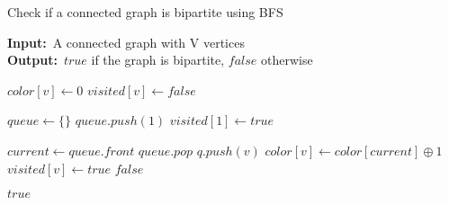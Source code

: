 \documentclass[12pt]{article}
\renewcommand{\algorithmicrequire}{\textbf{Input:}}
\renewcommand{\algorithmicensure}{\textbf{Output:}}
\begin{document}
\begin{algorithm}

  \caption{Check if a connected graph is bipartite using BFS}
  
  \algorithmicrequire \ A connected graph with V vertices\\
  \algorithmicensure \ $true$ if the graph is bipartite, $false$ otherwise
  
  \begin{algorithmic}[1]
    
    \Statex
    
    
        
         
            \State $color[v] \gets 0$
            \State $visited[v] \gets false$
        \EndFor
        
        \Statex
        \State $queue \gets \{\}$ 
        \State $queue.push(1)$ 
        \State $visited[1] \gets true$
        
        \Statex
        
            \State $current \gets queue.front$
            \State $queue.pop$
                    \State $q.push(v)$ 
                    \State $color[v] \gets color[current] \oplus 1$ 
                    \State $visited[v] \gets true$
                \Else
                     
                        \State \Return $false$ 
                    \EndIf
                \EndIf
            \EndFor
        \EndWhile
        
        \Statex 
        
        \State \Return $true$
    \EndFunction
  \end{algorithmic}
  
\end{algorithm}
\end{document}
